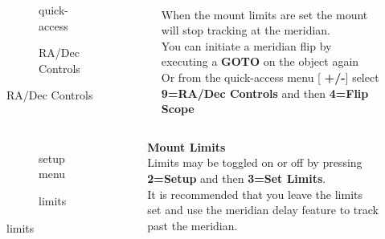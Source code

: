 \begin{frame}[t]{\insertsubsectionhead}
    \begin{columns}[T]
      \begin{figure}[ht]
          \begin{subfigure}{0.67\textwidth}
          \caption{quick-access}
        \end{subfigure}
        \vspace{\fill}
        \begin{subfigure}{0.67\textwidth}
          \caption{RA/Dec Controls}
        \end{subfigure}
      \end{figure}
    \large
    \ \\[0.25ex]
    When the mount limits are set the mount will stop tracking at the
    meridian. \\[1ex]

    You can initiate a meridian flip by executing a \textbf{GOTO} on the object
    again \\[1ex]

    Or from the quick-access menu [ \textbf{+/-}] select \textbf{9=RA/Dec Controls}
    and then \textbf{4=Flip Scope}

  \end{columns}
\end{frame}


\begin{frame}[t]{\insertsubsectionhead}
    \begin{columns}[T]
      \begin{figure}[ht]
          \begin{subfigure}{0.67\textwidth}
          \caption{setup menu}
        \end{subfigure}
        \vspace{\fill}
        \begin{subfigure}{0.67\textwidth}
          \caption{limits}
        \end{subfigure}
      \end{figure}
    \large
    \textbf{Mount Limits} \\[0.25ex]

    Limits may be toggled on or off by pressing \textbf{2=Setup} and
    then \textbf{3=Set Limits}. \\[1ex]

    It is recommended that you leave the limits set and use the meridian delay
    feature to track past the meridian. 
  \end{columns}
\end{frame}

